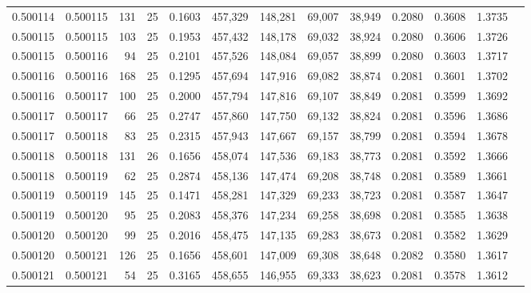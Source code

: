 \begin{tabular}{rrrrrrrrrrrrr}
0.500114 & 0.500115 & 131 &  25 &                                     0.1603 & 457,329 & 148,281 &  69,007 &  38,949 & 0.2080 & 0.3608 & 1.3735 \\
0.500115 & 0.500115 & 103 &  25 &                                     0.1953 & 457,432 & 148,178 &  69,032 &  38,924 & 0.2080 & 0.3606 & 1.3726 \\
0.500115 & 0.500116 &  94 &  25 &                                     0.2101 & 457,526 & 148,084 &  69,057 &  38,899 & 0.2080 & 0.3603 & 1.3717 \\
0.500116 & 0.500116 & 168 &  25 &                                     0.1295 & 457,694 & 147,916 &  69,082 &  38,874 & 0.2081 & 0.3601 & 1.3702 \\
0.500116 & 0.500117 & 100 &  25 &                                     0.2000 & 457,794 & 147,816 &  69,107 &  38,849 & 0.2081 & 0.3599 & 1.3692 \\
0.500117 & 0.500117 &  66 &  25 &                                     0.2747 & 457,860 & 147,750 &  69,132 &  38,824 & 0.2081 & 0.3596 & 1.3686 \\
0.500117 & 0.500118 &  83 &  25 &                                     0.2315 & 457,943 & 147,667 &  69,157 &  38,799 & 0.2081 & 0.3594 & 1.3678 \\
0.500118 & 0.500118 & 131 &  26 &                                     0.1656 & 458,074 & 147,536 &  69,183 &  38,773 & 0.2081 & 0.3592 & 1.3666 \\
0.500118 & 0.500119 &  62 &  25 &                                     0.2874 & 458,136 & 147,474 &  69,208 &  38,748 & 0.2081 & 0.3589 & 1.3661 \\
0.500119 & 0.500119 & 145 &  25 &                                     0.1471 & 458,281 & 147,329 &  69,233 &  38,723 & 0.2081 & 0.3587 & 1.3647 \\
0.500119 & 0.500120 &  95 &  25 &                                     0.2083 & 458,376 & 147,234 &  69,258 &  38,698 & 0.2081 & 0.3585 & 1.3638 \\
0.500120 & 0.500120 &  99 &  25 &                                     0.2016 & 458,475 & 147,135 &  69,283 &  38,673 & 0.2081 & 0.3582 & 1.3629 \\
0.500120 & 0.500121 & 126 &  25 &                                     0.1656 & 458,601 & 147,009 &  69,308 &  38,648 & 0.2082 & 0.3580 & 1.3617 \\
0.500121 & 0.500121 &  54 &  25 &                                     0.3165 & 458,655 & 146,955 &  69,333 &  38,623 & 0.2081 & 0.3578 & 1.3612 \\

\end{tabular}
